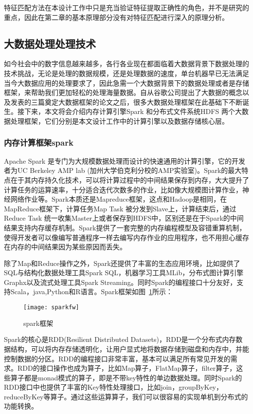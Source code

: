 特征匹配方法在本设计工作中只是充当验证特征提取正确性的角色，并不是研究的重点，因此在第二章的基本原理部分没有对特征匹配进行深入的原理分析。

\subsection{大数据处理处理技术}
如今社会中的数字信息越来越多，各行各业现在都面临着大数据背景下数据处理的技术挑战，无论是处理的数据规模，还是处理数据的速度，单台机器早已无法满足当今大数据应用的处理要求了，因此急需一个大数据背景下的数据处理或者是存储框架，来帮助我们更加轻松的处理海量数据。自从谷歌公司提出了大数据的概念以及发表的三篇奠定大数据框架的论文之后，很多大数据处理框架在此基础下不断诞生。接下来，本文将会介绍内存计算引擎Spark 和分布式文件系统HDFS 两个大数据处理框架，它们分别是本文设计工作中的计算引擎以及数据存储核心层。
\subsubsection{内存计算框架spark}
Apache Spark 是专门为大规模数据处理而设计的快速通用的计算引擎，它的开发者为UC Berkeley AMP lab (加州大学伯克利分校的AMP实验室)。Spark的最大特点在于其内存持久化技术，可以将计算过程中的中间结果保存到内存，大大提升了计算任务的运算速率，十分适合迭代次数多的作业，比如像大规模图计算作业，神经网络作业等。Spark本质还是Mapreduce框架，这点和Hadoop是相同，在MapReduce框架下，计算任务Map Task 被分发到Slave上，计算结束后，通过Reduce Task 统一收集Master上或者保存到HDFS中，区别还是在于Spark的中间结果支持内存缓存机制。Spark提供了一套完整的内存编程模型及容错重算机制，使得开发者可以像编写普通程序一样去编写内存作业的应用程序，也不用担心缓存在内存的中间结果因为某些原因而丢失。

除了Map和Reduce操作之外，Spark还提供了丰富的生态应用环境，比如提供了SQL与结构化数据处理工具Spark SQL，机器学习工具MLib，分布式图计算引擎Graphx以及流式处理工具Spark Streaming。同时Spark的编程接口十分友好，支持Scala，java,Python和R语言。Spark框架如图~\ref{fig:sparkfw}所示：
\begin{figure}[htp]
\centering
\texttt{[image: sparkfw]}
\caption{spark框架}
\label{fig:sparkfw}
\end{figure}

Spark的核心是RDD(Resilient Distributed Datasets)，RDD是一个分布式内存数据结构，可以将内存存储透明化，让用户显式地将数据存储到磁盘和内存中，并能控制数据的分区。RDD的编程接口非常丰富，基本可以满足所有常见开发的需求。RDD的接口操作也成为算子，比如Map算子，FlatMap算子，filter算子，这些算子都是monad模式的算子，即是不带key特性的单边数据处理。同时Spark的RDD接口中也提供了丰富的Key特性处理接口，比如join，groupByKey，reduceByKey等算子。通过这些运算算子，我们可以很容易的实现单机到分布式的功能转换。

